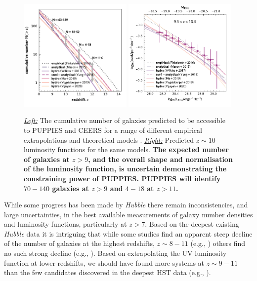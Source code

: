 \documentclass[12pt]{article}
\begin{document}
 \begin{figure}[h!]
    \centering
    \includegraphics[width=0.49\textwidth]{figs/CN_models.pdf}
    \includegraphics[width=0.49\textwidth]{figs/LF_models_10.pdf}
    \vspace{-5mm}
    \caption{\emph{\underline{Left:}} The cumulative number of galaxies predicted to be accessible to PUPPIES and CEERS for a range of different empirical extrapolations and theoretical models \citep{2017MNRAS.469.2517W, 2018MNRAS.477..219M, 2019MNRAS.483.2983Y, 2020MNRAS.tmp.3168L}. \emph{\underline{Right:}} Predicted $z\sim 10$ luminosity functions for the same models. \textbf{The expected number of galaxies at $z>9$, and the overall shape and normalisation of the luminosity function, is uncertain demonstrating the constraining power of PUPPIES. PUPPIES will identify $70-140$ galaxies at $z>9$ and $4-18$ at $z>11$.}}
    \label{fig:models}
\end{figure}


While some progress has been made by \emph{Hubble} there remain inconsistencies, and large uncertainties, in the best available measurements of galaxy number densities and luminosity functions, particularly at $z > 7$.  Based on the deepest existing \emph{Hubble} data it is intriguing that while some studies find an apparent steep decline of the number of galaxies at the highest redshifts, $z \sim 8-11$ (e.g., \citealt{Ellis2013, Schenker2013, Bouwens2016, Oesch2018}) others find no such strong decline (e.g., \citealt{Coe2013, McLeod2016}). Based on extrapolating the UV luminosity function at lower redshifts, we should have found more systems at $z \sim 9-11$ than the few candidates discovered in the deepest HST data (e.g., \citealt{Oesch2013}).  
\end{document}
